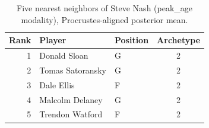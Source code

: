 \begin{table}[htbp]
  \centering\small
  \begin{tabular}{rllc}
    \toprule
    Rank & Player & Position & Archetype \\
    \midrule
    1 & Donald Sloan & G & 2 \\
    2 & Tomas Satoransky & G & 2 \\
    3 & Dale Ellis & F & 2 \\
    4 & Malcolm Delaney & G & 2 \\
    5 & Trendon Watford & F & 2 \\
    \bottomrule
  \end{tabular}
  \caption{Five nearest neighbors of Steve Nash (peak_age modality), Procrustes-aligned posterior mean.}
  \label{tab:Steve_Nash_neighbors_peak_age}
\end{table}

